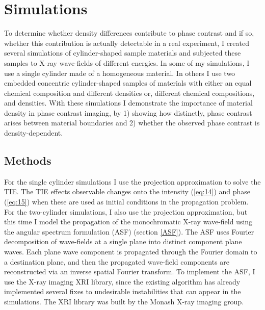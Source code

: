 \documentclass[10pt, a4paper, singlespacing]{report}
\begin{document}
\chapter{Simulations}\label{Simulations}

To determine whether density differences contribute to phase contrast and if so, whether this contribution is actually detectable in a real experiment, I created several simulations of cylinder-shaped sample materials and subjected these samples to X-ray wave-fields of different energies. In some of my simulations, I use a single cylinder made of a homogeneous material. In others I use two embedded concentric cylinder-shaped samples of materials with either an equal chemical composition and different densities or, different chemical compositions, and densities. With these simulations I demonstrate the importance of material density in phase contrast imaging,  by 1) showing how distinctly, phase contrast arises between material boundaries and 2) whether the observed phase contrast is density-dependent. 

\section{Methods}\label{Methods}

For the single cylinder simulations I use the projection approximation to solve the TIE. The TIE effects observable changes onto the intensity (\ref{eq:14}) and phase (\ref{eq:15}) when these are used as initial conditions in the propagation problem. For the two-cylinder simulations, I also use the projection approximation, but this time I model the propagation of the monochromatic X-ray wave-field using the angular spectrum formulation (ASF) (section \ref{ASF}). The ASF uses Fourier decomposition of wave-fields at a single plane into distinct component plane waves. Each plane wave component is propagated through the Fourier domain to a destination plane, and then the propagated wave-field components are reconstructed via an inverse spatial Fourier transform\cite{Goodman}. To implement the ASF, I use the X-ray imaging XRI library, since the existing algorithm has already implemented several fixes to undesirable instabilities that can appear in the simulations. The XRI library was built by the Monash X-ray imaging group.
\end{document}
